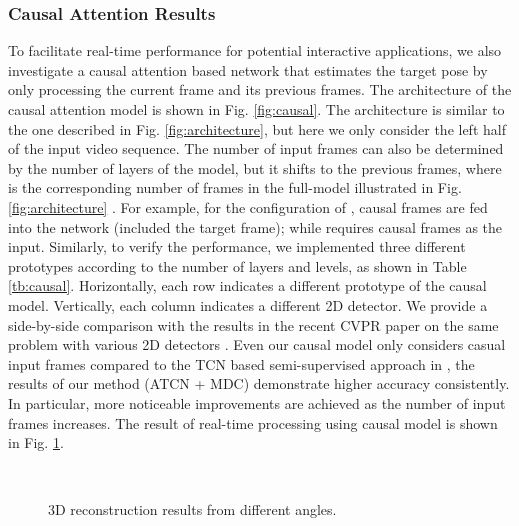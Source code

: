 \documentclass[twocolumn]{svjour3}          \smartqed  \usepackage{graphicx}
\begin{document}
\subsubsection*{\bf Causal Attention Results}
To facilitate real-time performance for potential interactive applications, we also investigate a causal attention based network that estimates the target pose by only processing the current frame and its previous frames. The architecture of the causal attention model is shown in Fig. \ref{fig:causal}. The architecture is similar to the one described in Fig. \ref{fig:architecture}, but here we only consider the left half of the input video sequence. The number of input frames can also be determined by the number of layers of the model, but it shifts to the  previous frames, where  is the corresponding number of frames in the full-model illustrated in Fig. \ref{fig:architecture} . For example, for the configuration of  ,  causal frames are fed into the network (included the target frame); while  requires  causal frames as the input. Similarly, to verify the performance, we implemented three different prototypes according to the number of layers and levels, as shown in Table \ref{tb:causal}. Horizontally, each row indicates a different prototype of the causal model. Vertically, each column indicates a different 2D detector. We provide a side-by-side comparison with the results in the recent CVPR paper on the same problem with various 2D detectors \citep{Pavllo2019}. Even our causal model only considers casual input frames compared to the TCN based semi-supervised approach in \citep{Pavllo2019}, the results of our method (ATCN + MDC) demonstrate higher accuracy consistently. In particular, more noticeable improvements are achieved as the number of input frames increases. The result of real-time processing using causal model is shown in Fig. \ref{Multi-angle}.



\begin{figure}[]
\centering
{}
\\
\caption{3D reconstruction results from different angles.}
\label{Multi-angle}
\end{figure}
\end{document}

